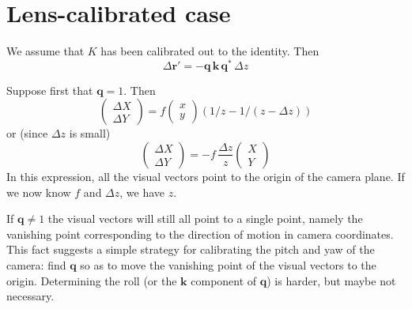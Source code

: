 \documentclass{article}
\def\r{\mathbf{r}}
\def\q{\mathbf{q}}
\def\k{\mathbf{k}}
\begin{document}
\section{Lens-calibrated case}

We assume that $K$ has been calibrated out to the identity.  Then
\begin{equation}
  \Delta\r' = - \q \, \k \, \q^* \, \Delta z
\end{equation}

Suppose first that $\q=1$.  Then
\begin{equation}
   \begin{pmatrix} \Delta X \\ \Delta Y \end{pmatrix} =
   f \begin{pmatrix} x \\ y \end{pmatrix}
   \left(1/z-1/(z-\Delta z)\right)
\end{equation}
or (since $\Delta z$ is small)
\begin{equation}
   \begin{pmatrix} \Delta X \\ \Delta Y \end{pmatrix} =
-f \, \frac{\Delta z}z \begin{pmatrix} X \\ Y \end{pmatrix}
\end{equation}
In this expression, all the visual vectors point to the origin of the
camera plane.  If we now know $f$ and $\Delta z$, we have $z$.

If $\q\neq1$ the visual vectors will still all point to a single
point, namely the vanishing point corresponding to the direction of
motion in camera coordinates.  This fact suggests a simple strategy
for calibrating the pitch and yaw of the camera: find $\q$ so as to
move the vanishing point of the visual vectors to the origin.
Determining the roll (or the $\k$ component of $\q$) is harder, but
maybe not necessary.
\end{document}
